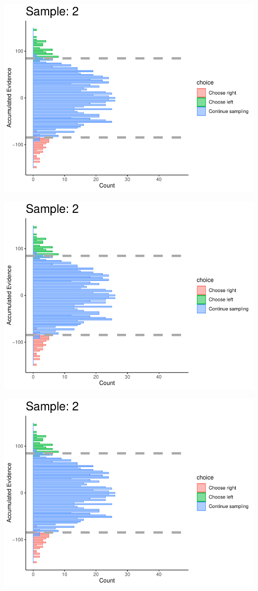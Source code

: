 \documentclass[
]{book}
\begin{document}
\begin{center}\includegraphics[width=0.8\linewidth]{LateNightBayes_files/figure-latex/collapsing_check-14} \end{center}

\begin{center}\includegraphics[width=0.8\linewidth]{LateNightBayes_files/figure-latex/collapsing_check-15} \end{center}

\begin{center}\includegraphics[width=0.8\linewidth]{LateNightBayes_files/figure-latex/collapsing_check-16} \end{center}
\end{document}
